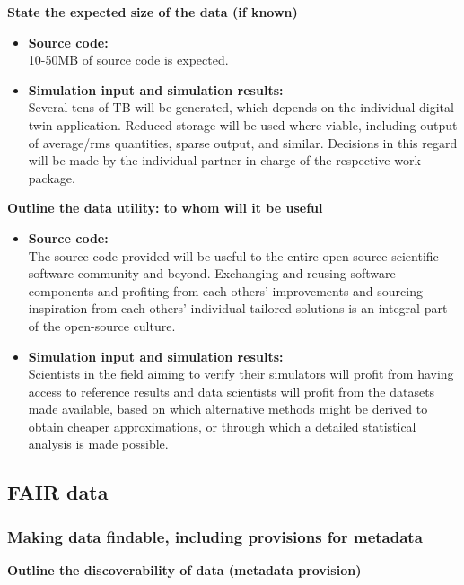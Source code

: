 \documentclass[a4paper,12pt]{article}
\begin{document}
\noindent \textbf{State the expected size of the data (if known)} 

\begin{itemize}
    \item  \textbf{Source code:}\\
        10-50MB of source code is expected.
    \item  \textbf{Simulation input and simulation results:}\\
        Several tens of TB will be generated, which depends on the individual digital twin application.
        Reduced storage will be used where viable, including output of average/rms
        quantities, sparse output, and similar. Decisions in this regard will be made by the individual
        partner in charge of the respective work package.
\end{itemize}

\noindent \textbf{Outline the data utility: to whom will it be useful}

\begin{itemize}
    \item  \textbf{Source code:}\\
        The source code provided will be useful to the entire open-source scientific software community and beyond. Exchanging and reusing software components and profiting from each others' improvements and sourcing inspiration from each others' individual tailored solutions is an integral part of the open-source culture.
    \item  \textbf{Simulation input and simulation results:}\\
        Scientists in the field aiming to verify their simulators will profit from having access to reference results and data scientists will profit from the datasets made available, based on which alternative methods might be derived to obtain cheaper approximations, or through which a detailed statistical analysis is made possible.
\end{itemize}

\subsection{FAIR data}

\subsubsection{Making data findable, including provisions for metadata}

\noindent \textbf{Outline the discoverability of data (metadata provision)}
\end{document}
